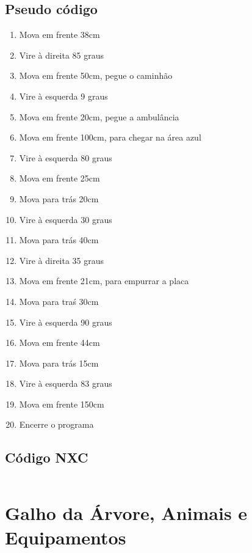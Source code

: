 \documentclass{article}
\begin{document}
	\subsection{Pseudo código}
		\begin{enumerate}
			\item Mova em frente 38cm
		    \item Vire à direita 85 graus
		    \item Mova em frente 50cm, pegue o caminhão
			\item Vire à esquerda 9 graus
			\item Mova em frente 20cm, pegue a ambulância
			\item Mova em frente 100cm, para chegar na área azul
		    \item Vire à esquerda 80 graus
			\item Mova em frente 25cm
			\item Mova para trás 20cm
		    \item Vire à esquerda 30 graus
		    \item Mova para trás 40cm
		    \item Vire à direita 35 graus
		    \item Mova em frente 21cm, para empurrar a placa
		    \item Mova para traś 30cm
		    \item Vire à esquerda 90 graus
		    \item Mova em frente 44cm
		    \item Mova para trás 15cm
		    \item Vire à esquerda 83 graus
		    \item Mova em frente 150cm
		    \item Encerre o programa
		\end{enumerate}

	\subsection{Código NXC}
		\inputminted[linenos, frame = single]{c}{../Ambulancia.nxc}

\newpage
\section{Galho da Árvore, Animais e Equipamentos}
\end{document}
